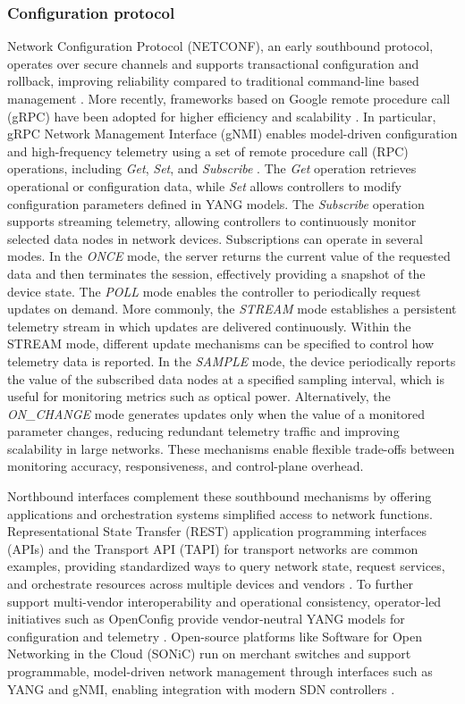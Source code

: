 \subsubsection{Configuration protocol}\label{protocol}
Network Configuration Protocol (NETCONF), an early southbound protocol, operates over secure channels and supports transactional configuration and rollback, improving reliability compared to traditional command-line based management \cite{rfc6241}.
More recently, frameworks based on Google remote procedure call (gRPC) have been adopted for higher efficiency and scalability \cite{draft_kumar_rtgwg_grpc_protocol_00}.
In particular, gRPC Network Management Interface (gNMI) enables model-driven configuration and high-frequency telemetry using a set of remote procedure call (RPC) operations, including \textit{Get}, \textit{Set}, and \textit{Subscribe} \cite{openconfig_gnmi_spec, cisco_gnmi_2018}.
The \textit{Get} operation retrieves operational or configuration data, while \textit{Set} allows controllers to modify configuration parameters defined in YANG models.
The \textit{Subscribe} operation supports streaming telemetry, allowing controllers to continuously monitor selected data nodes in network devices.
Subscriptions can operate in several modes.
In the \textit{ONCE} mode, the server returns the current value of the requested data and then terminates the session, effectively providing a snapshot of the device state.
The \textit{POLL} mode enables the controller to periodically request updates on demand.
More commonly, the \textit{STREAM} mode establishes a persistent telemetry stream in which updates are delivered continuously.
Within the STREAM mode, different update mechanisms can be specified to control how telemetry data is reported.
In the \textit{SAMPLE} mode, the device periodically reports the value of the subscribed data nodes at a specified sampling interval, which is useful for monitoring metrics such as optical power.
Alternatively, the \textit{ON\_CHANGE} mode generates updates only when the value of a monitored parameter changes, reducing redundant telemetry traffic and improving scalability in large networks.
These mechanisms enable flexible trade-offs between monitoring accuracy, responsiveness, and control-plane overhead.

Northbound interfaces complement these southbound mechanisms by offering applications and orchestration systems simplified access to network functions.
Representational State Transfer (REST) application programming interfaces (APIs) and the Transport API (TAPI) for transport networks are common examples, providing standardized ways to query network state, request services, and orchestrate resources across multiple devices and vendors \cite{github_rest_api_docs, rfc8597}.
To further support multi-vendor interoperability and operational consistency, operator-led initiatives such as OpenConfig provide vendor-neutral YANG models for configuration and telemetry \cite{openconfig_net}.
Open-source platforms like Software for Open Networking in the Cloud (SONiC) run on merchant switches and support programmable, model-driven network management through interfaces such as YANG and gNMI, enabling integration with modern SDN controllers \cite{sonic_foundation}.
